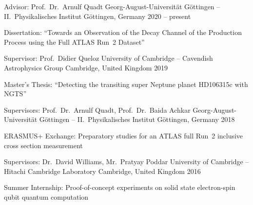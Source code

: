 %
\begin{cventries}%
  \cventry%
    {Advisor: Prof.\ Dr.\ Arnulf Quadt} %
    {Georg-August-Universit\"at G\"ottingen -- II.\ Physikalisches Institut} %
    {G\"ottingen, Germany} %
    {2020 -- present} %
    {%
      \begin{cvitems} %
        \item {%
          Dissertation:%
          ``Towards an Observation of the \Hbb Decay Channel of the \ttH Production Process using the Full\newline%
          ATLAS Run~2 Dataset''%
        }%
      \end{cvitems}%
    }%

  \cventry%
    {Supervisor: Prof.\ Didier Queloz} %
    {University of Cambridge -- Cavendish Astrophysics Group} %
    {Cambridge, United Kingdom} %
    {2019} %
    {%
      \begin{cvitems} %
        \item {Master's Thesis: ``Detecting the transiting super Neptune planet HD106315c with NGTS''}%
      \end{cvitems}%
    }%

  \cventry%
    {Supervisors: Prof.\ Dr.\ Arnulf Quadt, Prof.\ Dr.\ Baida Achkar} %
    {Georg-August-Universit\"at G\"ottingen -- II.\ Physikalisches Institut} %
    {G\"ottingen, Germany} %
    {2018} %
    {%
      \begin{cvitems} %
        \item {ERASMUS+ Exchange: Preparatory studies for an ATLAS full Run~2 \ttbar inclusive cross section measurement}%
      \end{cvitems}%
    }%

  \cventry%
    {Supervisors: Dr.\ David Williams, Mr.\ Pratyay Poddar} %
    {University of Cambridge -- Hitachi Cambridge Laboratory} %
    {Cambridge, United Kingdom} %
    {2016} %
    {%
      \begin{cvitems} %
        \item {Summer Internship: Proof-of-concept experiments on solid state electron-spin qubit quantum computation}%
      \end{cvitems}%
    }%
\end{cventries}%
